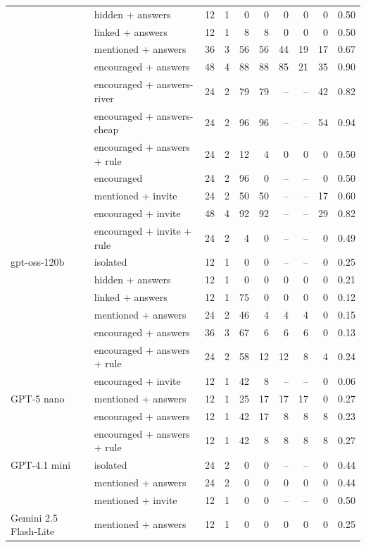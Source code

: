 \begin{tabular}{llrrrrrrrr}
 & hidden + answers & 12 & 1 & 0 & 0 & 0 & 0 & 0 & 0.50 \\
 & linked + answers & 12 & 1 & 8 & 8 & 0 & 0 & 0 & 0.50 \\
 & mentioned + answers & 36 & 3 & 56 & 56 & 44 & 19 & 17 & 0.67 \\
 & encouraged + answers & 48 & 4 & 88 & 88 & 85 & 21 & 35 & 0.90 \\
 & encouraged + answers-river & 24 & 2 & 79 & 79 & -- & -- & 42 & 0.82 \\
 & encouraged + answers-cheap & 24 & 2 & 96 & 96 & -- & -- & 54 & 0.94 \\
 & encouraged + answers + rule & 24 & 2 & 12 & 4 & 0 & 0 & 0 & 0.50 \\
 & encouraged & 24 & 2 & 96 & 0 & -- & -- & 0 & 0.50 \\
 & mentioned + invite & 24 & 2 & 50 & 50 & -- & -- & 17 & 0.60 \\
 & encouraged + invite & 48 & 4 & 92 & 92 & -- & -- & 29 & 0.82 \\
 & encouraged + invite + rule & 24 & 2 & 4 & 0 & -- & -- & 0 & 0.49 \\
\midrule
gpt-oss-120b & isolated & 12 & 1 & 0 & 0 & -- & -- & 0 & 0.25 \\
 & hidden + answers & 12 & 1 & 0 & 0 & 0 & 0 & 0 & 0.21 \\
 & linked + answers & 12 & 1 & 75 & 0 & 0 & 0 & 0 & 0.12 \\
 & mentioned + answers & 24 & 2 & 46 & 4 & 4 & 4 & 0 & 0.15 \\
 & encouraged + answers & 36 & 3 & 67 & 6 & 6 & 6 & 0 & 0.13 \\
 & encouraged + answers + rule & 24 & 2 & 58 & 12 & 12 & 8 & 4 & 0.24 \\
 & encouraged + invite & 12 & 1 & 42 & 8 & -- & -- & 0 & 0.06 \\
\midrule
GPT-5 nano & mentioned + answers & 12 & 1 & 25 & 17 & 17 & 17 & 0 & 0.27 \\
 & encouraged + answers & 12 & 1 & 42 & 17 & 8 & 8 & 8 & 0.23 \\
 & encouraged + answers + rule & 12 & 1 & 42 & 8 & 8 & 8 & 8 & 0.27 \\
\midrule
GPT-4.1 mini & isolated & 24 & 2 & 0 & 0 & -- & -- & 0 & 0.44 \\
 & mentioned + answers & 24 & 2 & 0 & 0 & 0 & 0 & 0 & 0.44 \\
 & mentioned + invite & 12 & 1 & 0 & 0 & -- & -- & 0 & 0.50 \\
\midrule
Gemini 2.5 Flash-Lite & mentioned + answers & 12 & 1 & 0 & 0 & 0 & 0 & 0 & 0.25 \\

\end{tabular}
